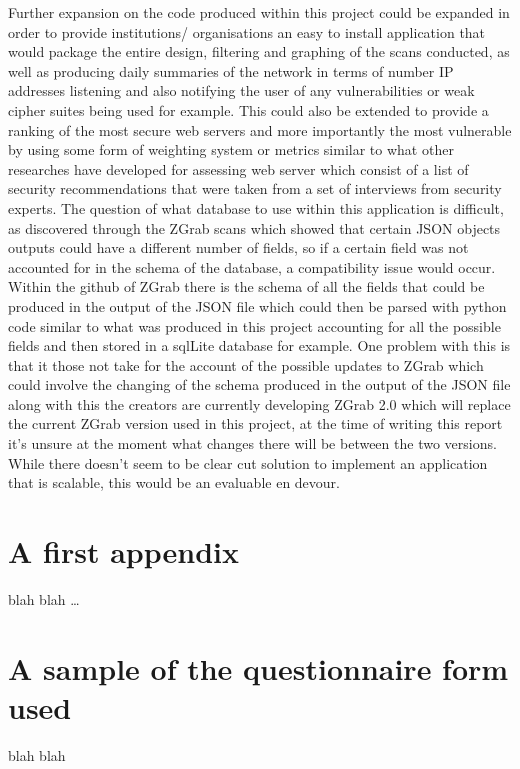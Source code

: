 \documentclass[a4wide,leqno,12pt]{report}
\begin{document}
Further expansion on the code produced within this project could be expanded in order to provide institutions/ organisations an easy to install application that would package the entire design, filtering and graphing of the scans conducted, as well as producing daily summaries of the network in terms of number IP addresses listening and also notifying the user of any vulnerabilities or weak cipher suites being used for example. This could also be extended to provide a ranking of the most secure web servers and more importantly the most vulnerable by using some form of weighting system or metrics similar to what other researches \cite{mendes2008assessing} have developed for assessing web server which consist of a list of security recommendations that were taken from a set of interviews from security experts. The question of what database to use within this application is difficult, as discovered through the ZGrab scans which showed that certain JSON objects outputs could have a different number of fields, so if a certain field was not accounted for in the schema of the database, a compatibility issue would occur. Within the github of ZGrab \cite{zgrabGithub} there is the schema of all the fields that could be produced in the output of the JSON file which could then be parsed with python code similar to what was produced in this project accounting for all the possible fields and then stored in a sqlLite database for example. One problem with this is that it those not take for the account of the possible updates to ZGrab which could involve the changing of the schema produced in the output of the JSON file along with this the creators are currently developing ZGrab 2.0 \cite{zgrab2Github} which will replace the current ZGrab version used in this project, at the time of writing this report it's unsure at the moment what changes there will be between the two versions. While there doesn't seem to be clear cut solution to implement an application that is scalable, this would be an evaluable en devour.

\bgroup
\linespread{1}




\appendix
\chapter{A first appendix}

blah blah \ldots


\chapter{A sample of the questionnaire form used}

blah blah

\egroup %
\end{document}
